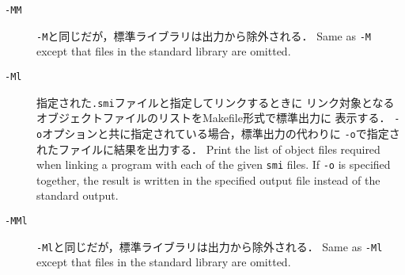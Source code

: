 \documentclass{jbook}
\begin{document}
\begin{description}
\item[{\tt -MM}]
\ifjp%
	{\tt -M}と同じだが，標準ライブラリは出力から除外される．
\else%
	Same as {\tt -M} except that files in the standard library
are omitted.
\fi%

\item[{\tt -Ml}]
\ifjp%
	指定された{\tt .smi}ファイルと指定してリンクするときに
リンク対象となるオブジェクトファイルのリストをMakefile形式で標準出力に
表示する．
	{\tt -o}オプションと共に指定されている場合，標準出力の代わりに
{\tt -o}で指定されたファイルに結果を出力する．
\else%
	Print the list of object files required when linking a program
with each of the given {\tt smi} files.
	If {\tt -o} is specified together,
the result is written in the specified output file instead of the
standard output.
\fi%

\item[{\tt -MMl}]
\ifjp%
	{\tt -Ml}と同じだが，標準ライブラリは出力から除外される．
\else%
	Same as {\tt -Ml} except that files in the standard library
are omitted.
\fi%

\end{description}
\end{document}
